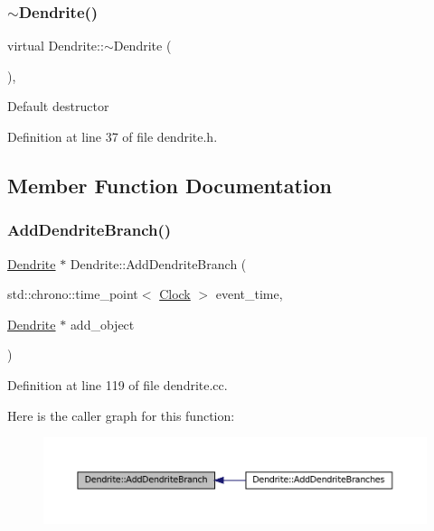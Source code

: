\subsubsection{\texorpdfstring{$\sim$\+Dendrite()}{~Dendrite()}}
{\footnotesize\ttfamily virtual Dendrite\+::$\sim$\+Dendrite (\begin{DoxyParamCaption}{ }\end{DoxyParamCaption})\hspace{0.3cm}{\ttfamily [inline]}, {\ttfamily [virtual]}}

Default destructor 

Definition at line 37 of file dendrite.\+h.



\subsection{Member Function Documentation}
\mbox{\label{class_dendrite_aab6cedff35cb8c65923b14c8034cccc0}} 
\subsubsection{\texorpdfstring{Add\+Dendrite\+Branch()}{AddDendriteBranch()}}
{\footnotesize\ttfamily \mbox{\hyperlink{class_dendrite}{Dendrite}} $\ast$ Dendrite\+::\+Add\+Dendrite\+Branch (\begin{DoxyParamCaption}\item[{std\+::chrono\+::time\+\_\+point$<$ \mbox{\hyperlink{universe_8h_a0ef8d951d1ca5ab3cfaf7ab4c7a6fd80}{Clock}} $>$}]{event\+\_\+time,  }\item[{\mbox{\hyperlink{class_dendrite}{Dendrite}} $\ast$}]{add\+\_\+object }\end{DoxyParamCaption})}



Definition at line 119 of file dendrite.\+cc.

Here is the caller graph for this function\+:\nopagebreak
\begin{figure}[H]
\begin{center}
\leavevmode
\includegraphics[width=350pt]{class_dendrite_aab6cedff35cb8c65923b14c8034cccc0_icgraph}
\end{center}
\end{figure}
\mbox{\label{class_dendrite_a3e6a80da180b60290545cfc92f221a05}} 
